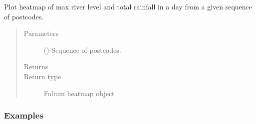 \documentclass[letterpaper,10pt,english]{sphinxmanual}
\begin{document}
\begin{fulllineitems}
\label{\detokenize{index:flood_tool.plot_heatmap}}
\sphinxAtStartPar
Plot heatmap of max river level and total rainfall in a day
from a given sequence of postcodes.
\begin{quote}\begin{description}
\item[{Parameters}] \leavevmode
\sphinxAtStartPar
{} () \textendash{} Sequence of postcodes.

\item[{Returns}] \leavevmode
\sphinxAtStartPar


\item[{Return type}] \leavevmode
\sphinxAtStartPar
Folium heatmap object

\end{description}\end{quote}
\subsubsection*{Examples}

\begin{sphinxVerbatim}[commandchars=\\\{\}]
\PYG{p}{[} \PYG{p}{]}
\end{sphinxVerbatim}

\end{fulllineitems}

\end{document}
